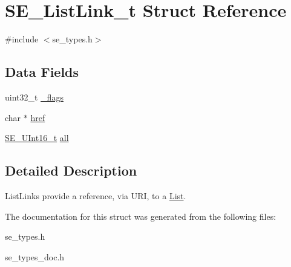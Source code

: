 \hypertarget{structSE__ListLink__t}{}\section{S\+E\+\_\+\+List\+Link\+\_\+t Struct Reference}
\label{structSE__ListLink__t}


{\ttfamily \#include $<$se\+\_\+types.\+h$>$}

\subsection*{Data Fields}
\begin{DoxyCompactItemize}
\item 
uint32\+\_\+t \hyperlink{group__ListLink_gad8a3a58e8432327078b8557e81ae92a6}{\+\_\+flags}
\item 
char $\ast$ \hyperlink{group__ListLink_gabee3c5cf373e1b81ded1da5f5c96ee0b}{href}
\item 
\hyperlink{group__UInt16_gac68d541f189538bfd30cfaa712d20d29}{S\+E\+\_\+\+U\+Int16\+\_\+t} \hyperlink{group__ListLink_ga7ec03b4bdba43fa2b504df453964acb5}{all}
\end{DoxyCompactItemize}


\subsection{Detailed Description}
List\+Links provide a reference, via U\+RI, to a \hyperlink{structList}{List}. 

The documentation for this struct was generated from the following files\+:\begin{DoxyCompactItemize}
\item 
se\+\_\+types.\+h\item 
se\+\_\+types\+\_\+doc.\+h\end{DoxyCompactItemize}
